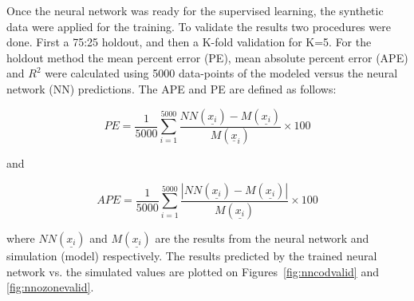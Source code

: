 \documentclass{optica-article}
\begin{document}
Once the neural network was ready for the supervised learning, the synthetic data were applied for the training.
To validate the results two procedures were done. First a 75:25 holdout, and then a K-fold validation for K=5.
For the holdout method the mean percent error (PE), mean absolute percent error (APE) and {$R^2$} were calculated using 5000 data-points of the modeled versus the neural network (NN) predictions. 
The APE and PE are defined as follows:

\begin{equation}
	\label{eq:PE}
	PE = \frac{1}{5000}\sum_{i=1}^{5000} \dfrac{NN(\underline{x_i}) - M(\underline{x_i})}{M(\underline{x}_i)} \times 100
\end{equation}

and

\begin{equation}
	\label{eq:APE}
	APE = \frac{1}{5000} \sum_{i=1}^{5000} \dfrac{|NN(\underline{x_i}) - M(\underline{x_i})|}{M(\underline{x_i})} \times 100
\end{equation}

where $NN(\underline{x_i})$ and $M(\underline{x_i})$ are the results from the neural network and simulation (model) respectively.
The results predicted by the trained neural network vs. the simulated values are plotted on Figures~\ref{fig:nncodvalid} and \ref{fig:nnozonevalid}. 
\end{document}

